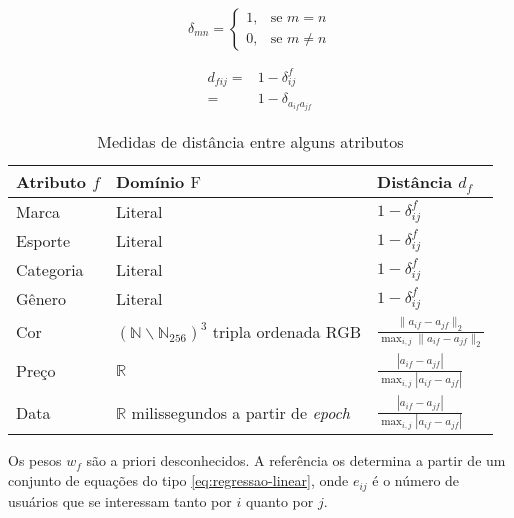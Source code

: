 \begin{equation}
\label{eq:delta}
\delta_{mn} = 
\begin{cases}
1, &\text{se }m=n \\
0, &\text{se }m \neq n
\end{cases} 
\end{equation}

\begin{equation}
\label{eq:dfij}
\begin{split}
d_{fij} =& 1-\delta_{ij}^f \\
    =& 1-\delta_{a_{if} a_{jf}}
\end{split} 
\end{equation}

\begin{table}[hp]
\begin{center}
    \caption{Medidas de distância entre alguns atributos}
    \label{tab:medidas-distancia}
    \begin{tabular}{  | >{\arraybackslash} m{3cm} | >{\arraybackslash} m{3cm} | >{\centering\arraybackslash} m{3cm} | } 
    \hline
    \textbf{Atributo} $f$ & \textbf{Domínio} $\mathrm{F}$ & \textbf{Distância} $d_f$ \\ \hline
    Marca & Literal & $1-\delta^f_{ij}$ \\ \hline    
    Esporte & Literal & $1-\delta^f_{ij}$ \\ \hline
    Categoria & Literal & $1-\delta^f_{ij}$ \\ \hline            
    Gênero & Literal & $1-\delta^f_{ij}$ \\ \hline            
    Cor & $\left(\mathbb{N}\backslash \mathbb{N}_{256}\right)^3$  tripla ordenada RGB & $ \frac{\lVert a_{if}-a_{jf} \rVert_2}{\max_{i,j}{\lVert a_{if}-a_{jf} \rVert_2}} $ \\ \hline
    Preço & $\mathbb{R}$ & $ \frac{\left| a_{if}-a_{jf} \right|}{\max_{i,j}{\left| a_{if}-a_{jf} \right|}} $ \\ \hline
    Data & $\mathbb{R}$ milissegundos a partir de \textit{epoch} \cite{epoch} & $ \frac{\left| a_{if}-a_{jf} \right|}{\max_{i,j}{\left| a_{if}-a_{jf} \right|}} $ \\ \hline
    \end{tabular}
\end{center}
\end{table}
 
Os pesos $w_f$ são a priori desconhecidos. A referência \cite{symeonidis2007feature} os determina a partir de um conjunto de equações do tipo \ref{eq:regressao-linear}, onde $e_{ij}$ é o número de usuários que se interessam tanto por $i$ quanto por $j$. 


